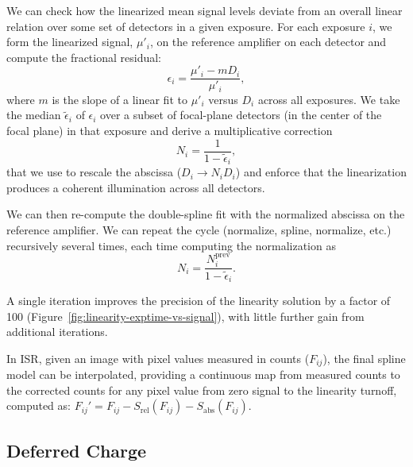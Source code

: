 We can check how the linearized mean signal levels deviate from an overall linear relation over some set of detectors in a given exposure.
For each exposure $i$, we form the linearized signal, $\mu'_i$, on the reference amplifier on each detector and compute the fractional residual:
\begin{equation}
    \epsilon_i = \frac{\mu'_i - m D_{i}}{\mu'_i},
\end{equation}
where $m$ is the slope of a linear fit to $\mu'_i$ versus $D_{i}$ across all exposures.
We take the median $\tilde{\epsilon}_i$ of $\epsilon_i$ over a subset of focal-plane detectors (in the center of the focal plane) in that exposure and derive a multiplicative correction
\begin{equation}
    N_i = \frac{1}{1 - \tilde{\epsilon}_i},
\end{equation} that we use to rescale the abscissa ($D_{i} \rightarrow N_i D_{i}$) and enforce that the linearization produces a coherent illumination across all detectors.

We can then re-compute the double-spline fit with the normalized abscissa on the reference amplifier. We can repeat the cycle (normalize, spline, normalize, etc.) recursively several times, each time computing the normalization as \begin{equation}
    N_i = \frac{N_i^{\mathrm{prev}}}{1 - \tilde{\epsilon}_i}.
\end{equation}

A single iteration improves the precision of the linearity solution by a factor of 100 (Figure~\ref{fig:linearity-exptime-vs-signal}), with little further gain from additional iterations.

In ISR, given an image with pixel values measured in counts ($F_{ij}$), the final spline model can be interpolated, providing a continuous map from measured counts to the corrected counts for any pixel value from zero signal to the linearity turnoff, computed as:
$F_{ij}' = F_{ij} - S_{\mathrm{rel}}(F_{ij}) - S_{\mathrm{abs}}(F_{ij})$.



\subsection{Deferred Charge} \label{sec:calibration-production:cti}

